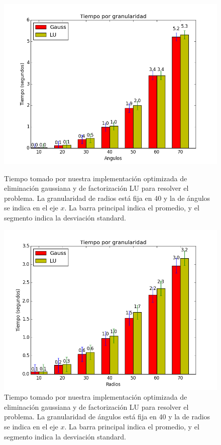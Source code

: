 \begin{figure}[H]
\centering
\begin{minipage}{0.48\textwidth}
  \centering
    \includegraphics[width=1\textwidth]{imgs/tiempos_opt_radios.png}
  \caption{\footnotesize{Tiempo tomado por nuestra implementación optimizada de eliminación gaussiana y de factorización LU para resolver el problema. La granularidad de radios está fija en 40 y la de ángulos se indica en el eje $x$. La barra principal indica el promedio, y el segmento indica la desviación standard.}}
  \label{fig:tiempoopt1}
\end{minipage}%
\hspace{0.03\textwidth}
\begin{minipage}{0.48\textwidth}   
  \centering
    \includegraphics[width=1\textwidth]{imgs/tiempos_opt_angulos.png} 
  \caption{\footnotesize{Tiempo tomado por nuestra implementación optimizada de eliminación gaussiana y de factorización LU para resolver el problema. La granularidad de ángulos está fija en 40 y la de radios se indica en el eje $x$. La barra principal indica el promedio, y el segmento indica la desviación standard.}}
  \label{fig:tiempoopt2}
\end{minipage}
\end{figure}


